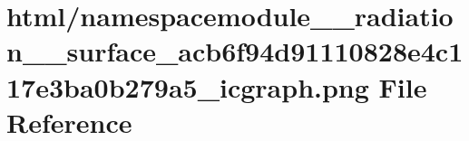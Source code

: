 \hypertarget{namespacemodule____radiation____surface__acb6f94d91110828e4c117e3ba0b279a5__icgraph_8png}{}\section{html/namespacemodule\+\_\+\+\_\+radiation\+\_\+\+\_\+surface\+\_\+acb6f94d91110828e4c117e3ba0b279a5\+\_\+icgraph.png File Reference}
\label{namespacemodule____radiation____surface__acb6f94d91110828e4c117e3ba0b279a5__icgraph_8png}
